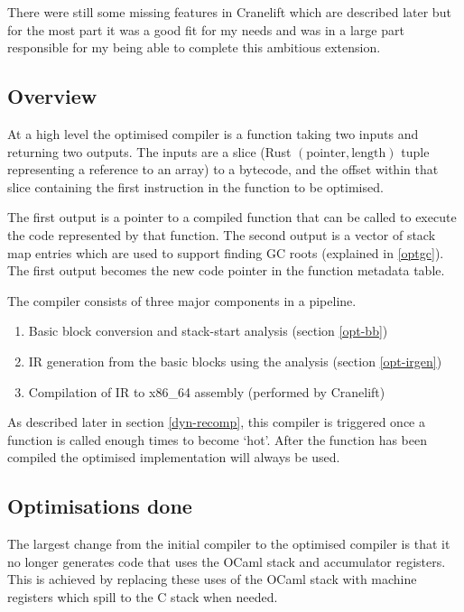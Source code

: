 There were still some missing features in Cranelift which are described later but for the most
part it was a good fit for my needs and was in a large part responsible for my being able to
complete this ambitious extension.

\subsection{Overview}

At a high level the optimised compiler is a function taking two inputs and returning two outputs.
The inputs are a slice (Rust $(\text{pointer}, \text{length})$ tuple representing a reference to an
array) to a bytecode, and the offset within that slice containing the first instruction in the
function to be optimised.

The first output is a pointer to a compiled function that can be called to execute the code
represented by that function. The second output is a vector of stack map entries which are used
to support finding GC roots (explained in \ref{optgc}). The first output becomes the new code
pointer in the function metadata table.

The compiler consists of three major components in a pipeline.

\begin{enumerate}
      \item Basic block conversion and stack-start analysis (section \ref{opt-bb})
      \item IR generation from the basic blocks using the analysis (section \ref{opt-irgen})
      \item Compilation of IR to x86\_64 assembly (performed by Cranelift)
\end{enumerate}

As described later in section \ref{dyn-recomp}, this compiler is triggered once a function is
called enough times to become `hot'. After the function has been compiled the optimised
implementation
will always be used.

\subsection{Optimisations done}

The largest change from the initial compiler to the optimised compiler is that it no longer
generates
code that uses the OCaml stack and accumulator registers. This is achieved by replacing these uses
of the OCaml stack with machine registers which spill to the C stack when needed.

